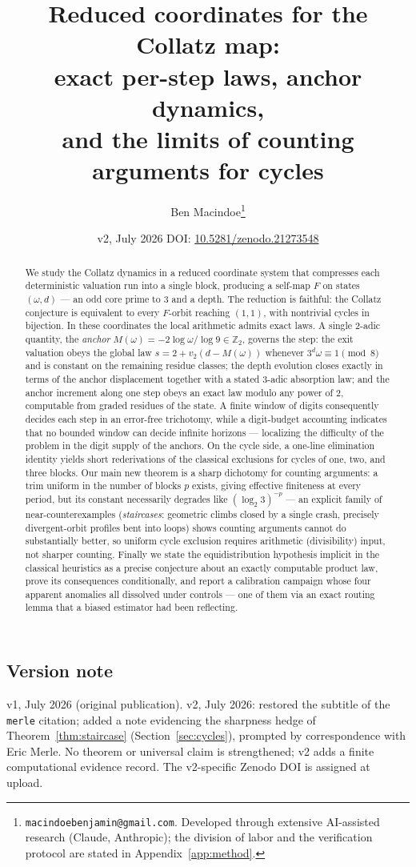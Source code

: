 \documentclass[11pt]{article}
\title{Reduced coordinates for the Collatz map:\\ exact per-step laws, anchor dynamics,\\ and the limits of counting arguments for cycles}
\author{Ben Macindoe\thanks{\texttt{macindoebenjamin@gmail.com}. Developed through extensive AI-assisted research (Claude, Anthropic); the division of labor and the verification protocol are stated in Appendix~\ref{app:method}.}}
\date{v2, July 2026 \;\cdot\; DOI: \href{https://doi.org/10.5281/zenodo.21273548}{10.5281/zenodo.21273548}}
\theoremstyle{remark}
\newcommand{\Z}{\mathbb{Z}}
\newcommand{\vt}[1]{v_2\!\left(#1\right)}
\newcommand{\w}{\omega}
\newcommand{\LL}{\log_2 3}
\begin{document}
\maketitle

\begin{abstract}
We study the Collatz dynamics in a reduced coordinate system that compresses each deterministic valuation run into a single block, producing a self-map $F$ on states $(\w,d)$ --- an odd core prime to $3$ and a depth. The reduction is faithful: the Collatz conjecture is equivalent to every $F$-orbit reaching $(1,1)$, with nontrivial cycles in bijection. In these coordinates the local arithmetic admits exact laws. A single $2$-adic quantity, the \emph{anchor} $M(\w) = -2\log\w/\log 9 \in \Z_2$, governs the step: the exit valuation obeys the global law $s = 2 + \vt{d - M(\w)}$ whenever $3^d\w \equiv 1 \pmod 8$ and is constant on the remaining residue classes; the depth evolution closes exactly in terms of the anchor displacement together with a stated $3$-adic absorption law; and the anchor increment along one step obeys an exact law modulo any power of $2$, computable from graded residues of the state. A finite window of digits consequently decides each step in an error-free trichotomy, while a digit-budget accounting indicates that no bounded window can decide infinite horizons --- localizing the difficulty of the problem in the digit supply of the anchors. On the cycle side, a one-line elimination identity yields short rederivations of the classical exclusions for cycles of one, two, and three blocks. Our main new theorem is a sharp dichotomy for counting arguments: a trim uniform in the number of blocks $p$ exists, giving effective finiteness at every period, but its constant necessarily degrades like $(\LL)^{-p}$ --- an explicit family of near-counterexamples (\emph{staircases}: geometric climbs closed by a single crash, precisely divergent-orbit profiles bent into loops) shows counting arguments cannot do substantially better, so uniform cycle exclusion requires arithmetic (divisibility) input, not sharper counting. Finally we state the equidistribution hypothesis implicit in the classical heuristics as a precise conjecture about an exactly computable product law, prove its consequences conditionally, and report a calibration campaign whose four apparent anomalies all dissolved under controls --- one of them via an exact routing lemma that a biased estimator had been reflecting.
\end{abstract}

\subsection*{Version note}
v1, July 2026 (original publication). v2, July 2026: restored the subtitle of the \texttt{merle} citation; added a note evidencing the sharpness hedge of Theorem~\ref{thm:staircase} (Section~\ref{sec:cycles}), prompted by correspondence with Eric Merle. No theorem or universal claim is strengthened; v2 adds a finite computational evidence record. The v2-specific Zenodo DOI is assigned at upload.
\end{document}
